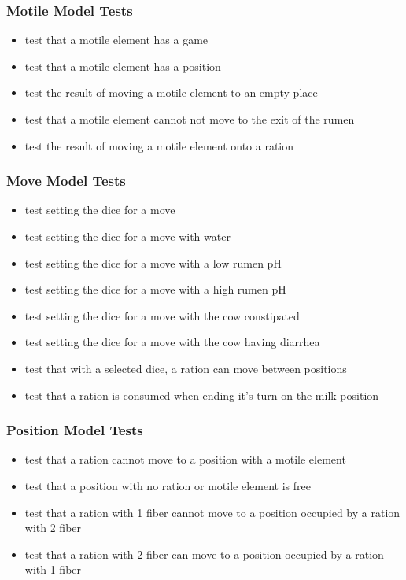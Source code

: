 \subsubsection{Motile Model Tests}
\begin{itemize}
	\item test that a motile element has a game
	\item test that a motile element has a position
	\item test the result of moving a motile element to an empty place
	\item test that a motile element cannot not move to the exit of the rumen
	\item test the result of moving a motile element onto a ration
\end{itemize}

\subsubsection{Move Model Tests}
\begin{itemize}
	\item test setting the dice for a move
	\item test setting the dice for a move with water
	\item test setting the dice for a move with a low rumen pH
	\item test setting the dice for a move with a high rumen pH
	\item test setting the dice for a move with the cow constipated
	\item test setting the dice for a move with the cow having diarrhea
	\item test that with a selected dice, a ration can move between positions
	\item test that a ration is consumed when ending it's turn on the milk position
\end{itemize}

\subsubsection{Position Model Tests}
\begin{itemize}
	\item test that a ration cannot move to a position with a motile element
	\item test that a position with no ration or motile element is free
	\item test that a ration with 1 fiber cannot move to a position occupied by a ration with 2 fiber
	\item test that a ration with 2 fiber can move to a position occupied by a ration with 1 fiber
\end{itemize}

